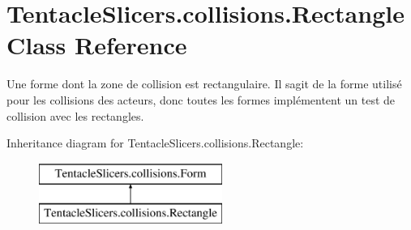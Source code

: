 \hypertarget{class_tentacle_slicers_1_1collisions_1_1_rectangle}{}\section{Tentacle\+Slicers.\+collisions.\+Rectangle Class Reference}
\label{class_tentacle_slicers_1_1collisions_1_1_rectangle}


Une forme dont la zone de collision est rectangulaire. Il s\textquotesingle{}agit de la forme utilisé pour les collisions des acteurs, donc toutes les formes implémentent un test de collision avec les rectangles.  


Inheritance diagram for Tentacle\+Slicers.\+collisions.\+Rectangle\+:\begin{figure}[H]
\begin{center}
\leavevmode
\includegraphics[height=2.000000cm]{class_tentacle_slicers_1_1collisions_1_1_rectangle}
\end{center}
\end{figure}
